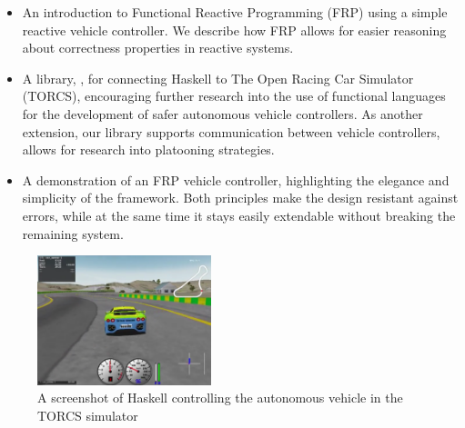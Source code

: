 \begin{itemize}
\item An introduction to Functional Reactive Programming (FRP) using a simple reactive vehicle controller. We describe how FRP allows for easier reasoning about correctness properties in reactive systems.

\item A library, \ourLib, for connecting Haskell to The Open Racing Car Simulator (TORCS), encouraging further research into the use of functional languages for the development of safer autonomous vehicle controllers. As another extension, our library supports communication between vehicle controllers, allows for research into platooning strategies.

\item A demonstration of an FRP vehicle controller, highlighting the elegance and simplicity of the framework. Both principles
  make the design resistant against errors, while at the same time it stays easily extendable without breaking the remaining system.

\end{itemize}

\begin{figure}[t]
\includegraphics[width=0.45\textwidth]{figs/racing.png}
\caption{A screenshot of Haskell controlling the autonomous vehicle in the TORCS simulator}
\label{fig:race}
\end{figure}
